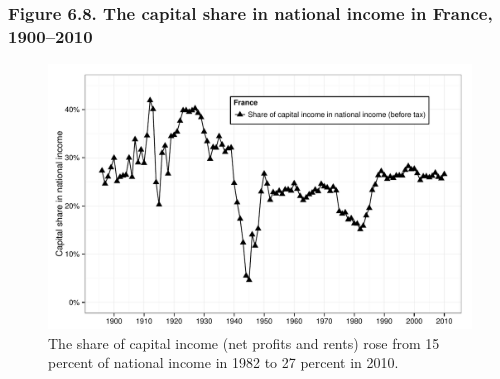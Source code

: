 \documentclass[t]{beamer}\usepackage[]{graphicx}\usepackage[]{color}
\newenvironment{knitrout}{}{} %
\begin{document}
\begin{frame}[label=Figure_6_8]
\frametitle{Figure 6.8. The capital share in national income in France, 1900--2010}
\begin{figure}[t]
\begin{minipage}[b]{\textwidth}
\centering
\begin{knitrout}\footnotesize
{}\color{fgcolor}

{\centering \includegraphics[width=1\linewidth]{figures/bw/Figure_6_8} 

}



\end{knitrout}
\caption{The share of capital income (net profits and rents) rose from 15 percent of national income in 1982 to 27 percent in 2010.}
\end{minipage}
\end{figure}
\end{frame}
\end{document}
